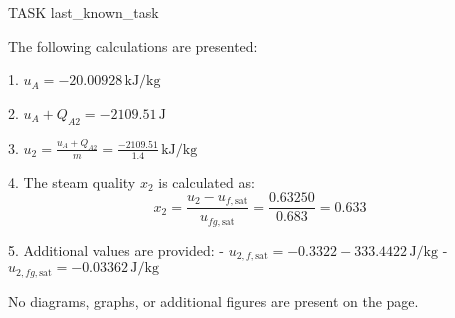TASK {last_known_task}

The following calculations are presented:

1. \( u_A = -20.00928 \, \text{kJ/kg} \)

2. \( u_A + Q_{A2} = -2109.51 \, \text{J} \)

3. \( u_2 = \frac{u_A + Q_{A2}}{m} = \frac{-2109.51}{1.4} \, \text{kJ/kg} \)

4. The steam quality \( x_2 \) is calculated as:
   \[
   x_2 = \frac{u_2 - u_{f,\text{sat}}}{u_{fg,\text{sat}}} = \frac{0.63250}{0.683} = 0.633
   \]

5. Additional values are provided:
   - \( u_{2,f,\text{sat}} = -0.3322 - 333.4422 \, \text{J/kg} \)
   - \( u_{2,fg,\text{sat}} = -0.03362 \, \text{J/kg} \)

No diagrams, graphs, or additional figures are present on the page.
